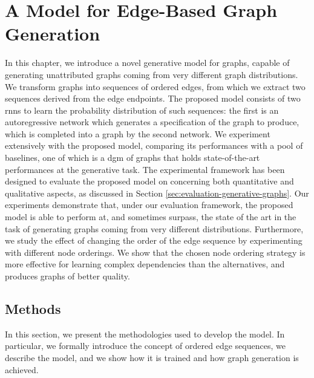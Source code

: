 \chapter{A Model for Edge-Based Graph Generation} %
\label{ch:deep-generative-learning-graphs}
In this chapter, we introduce a novel generative model for graphs, capable of generating unattributed graphs coming from very different graph distributions. We transform graphs into sequences of ordered edges, from which we extract two sequences derived from the edge endpoints. The proposed model consists of two \glspl{rnn} to learn the probability distribution of such sequences: the first is an autoregressive network which generates a specification of the graph to produce, which is completed into a graph by the second network. We experiment extensively with the proposed model, comparing its performances with a pool of baselines, one of which is a \gls{dgm} of graphs that holds state-of-the-art performances at the generative task. The experimental framework has been designed to evaluate the proposed model on concerning both quantitative and qualitative aspects, as discussed in Section \ref{sec:evaluation-generative-graphs}. Our experiments demonstrate that, under our evaluation framework, the proposed model is able to perform at, and sometimes surpass, the state of the art in the task of generating graphs coming from very different distributions. Furthermore, we study the effect of changing the order of the edge sequence by experimenting with different node orderings. We show that the chosen node ordering strategy  is more effective for learning complex dependencies than the alternatives, and produces graphs of better quality.

\section{Methods}
In this section, we present the methodologies used to develop the model. In particular, we formally introduce the concept of ordered edge sequences, we describe the model, and we show how it is trained and how graph generation is achieved.

